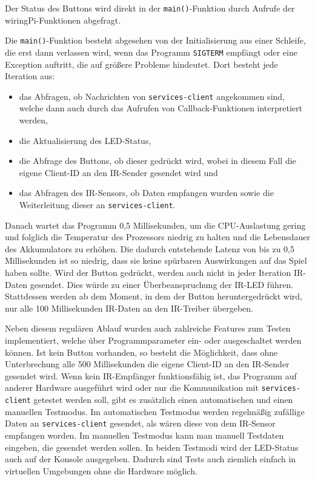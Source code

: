 Der Status des Buttons wird direkt in der \texttt{main()}-Funktion durch Aufrufe der
wiringPi-Funktionen abgefragt.

Die \texttt{main()}-Funktion besteht abgesehen von der Initialisierung aus einer Schleife, die erst
dann verlassen wird, wenn das Programm \texttt{SIGTERM} empfängt oder eine Exception auftritt, die
auf größere Probleme hindeutet.
Dort besteht jede Iteration aus:
\begin{itemize}
  \item
    das Abfragen, ob Nachrichten von \texttt{services-client} angekommen sind, welche dann auch
    durch das Aufrufen von Callback-Funktionen interpretiert werden,
  \item
    die Aktualisierung des LED-Status,
  \item
    die Abfrage des Buttons, ob dieser gedrückt wird, wobei in diesem Fall die eigene Client-ID an
    den IR-Sender gesendet wird und
  \item
    das Abfragen des IR-Sensors, ob Daten empfangen wurden sowie die Weiterleitung dieser an
    \texttt{services-client}.
\end{itemize}
Danach wartet das Programm 0,5 Millisekunden, um die CPU-Auslastung gering und folglich die
Temperatur des Prozessors niedrig zu halten und die Lebensdauer des Akkumulators zu erhöhen.
Die dadurch entstehende Latenz von bis zu 0,5 Millisekunden ist so niedrig, dass sie keine spürbaren
Auswirkungen auf das Spiel haben sollte.
Wird der Button gedrückt, werden auch nicht in jeder Iteration IR-Daten gesendet.
Dies würde zu einer Überbeanspruchung der IR-LED führen.
Stattdessen werden ab dem Moment, in dem der Button heruntergedrückt wird, nur alle 100
Millisekunden IR-Daten an den IR-Treiber übergeben.

Neben diesem regulären Ablauf wurden auch zahlreiche Features zum Testen implementiert, welche über
Programmparameter ein- oder ausgeschaltet werden können.
Ist kein Button vorhanden, so besteht die Möglichkeit, dass ohne Unterbrechung alle 500
Millisekunden die eigene Client-ID an den IR-Sender gesendet wird.
Wenn kein IR-Empfänger funktionsfähig ist, das Programm auf anderer Hardware ausgeführt wird oder
nur die Kommunikation mit \texttt{services-client} getestet werden soll, gibt es zusätzlich einen
automatischen und einen manuellen Testmodus.
Im automatischen Testmodus werden regelmäßig zufällige Daten an \texttt{services-client} gesendet,
als wären diese von dem IR-Sensor empfangen worden.
Im manuellen Testmodus kann man manuell Testdaten eingeben, die gesendet werden sollen.
In beiden Testmodi wird der LED-Status auch auf der Konsole ausgegeben.
Dadurch sind Tests auch ziemlich einfach in virtuellen Umgebungen ohne die Hardware möglich.

